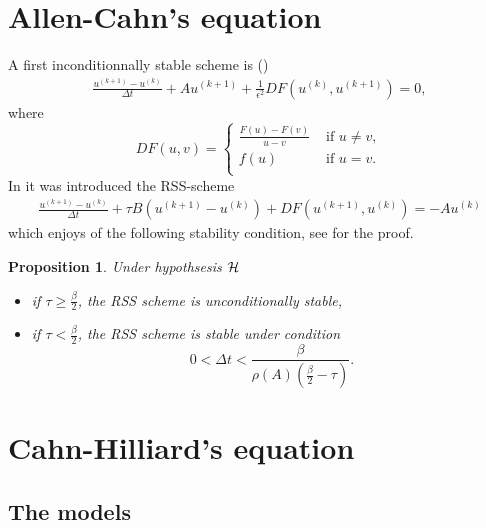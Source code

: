 \documentclass[11pt]{article}
\newtheorem{proposition}[theorem]{Proposition}
\newcommand{\Frac}[2] {\frac{\textstyle #1} {\textstyle #2}}
\begin{document}
\section{Allen-Cahn's equation}
A first inconditionnally stable scheme is (\cite{Elliott,ElliottStuart})
\begin{eqnarray}
 \Frac{u^{(k+1)}-u^{(k)}}{\Delta t} +Au^{(k+1)}+\Frac{1}{\epsilon^2}DF(u^{(k)},u^{(k+1)})=0,
 \label{ISAC1}
 \end{eqnarray}
where
$$
DF(u,v)=\left\{
\begin{array}{ll}
\Frac{F(u)-F(v)}{u-v} & \mbox{ if } u\neq v ,\\
f(u) & \mbox{ if } u= v.\\
\end{array}
\right.
$$ 
In \cite{BrachetChehabJSC} it was introduced the RSS-scheme
\begin{eqnarray}\label{RSSNLG}
\Frac{u^{(k+1)}-u^{(k)}}{\Delta t} +\tau B(u^{(k+1)}-u^{(k)})+DF(u^{(k+1)},u^{(k)})=
-Au^{(k)}
\end{eqnarray}
which enjoys of the following stability condition, see \cite{BrachetChehabJSC} for the proof.
\begin{proposition}
Under hypothsesis ${\cal H}$
\begin{itemize}
\item if $\tau \ge \Frac{\beta}{2}$, the RSS scheme is unconditionally stable,
\item if $\tau < \Frac{\beta}{2}$, the RSS scheme is stable under condition
$$
0<\Delta t < \Frac{\beta}{\rho(A)(\frac{\beta}{2}-\tau)}.
$$
\end{itemize}
\end{proposition}
%
%
\clearpage
\section{Cahn-Hilliard's equation}
\subsection{The models}
\end{document}
